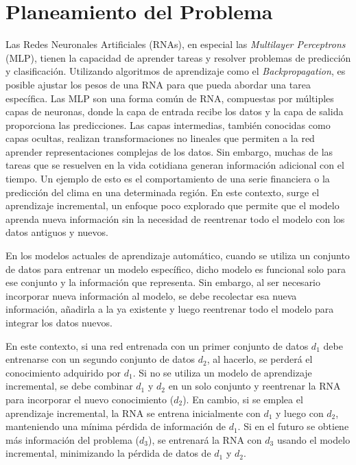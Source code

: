 \section{Planeamiento del Problema}

Las Redes Neuronales Artificiales (RNAs), en especial las \textit{Multilayer Perceptrons} (MLP), tienen la capacidad de aprender tareas y resolver problemas de predicción y clasificación. Utilizando algoritmos de aprendizaje como el \textit{Backpropagation}, es posible ajustar los pesos de una RNA para que pueda abordar una tarea específica. Las MLP son una forma común de RNA, compuestas por múltiples capas de neuronas, donde la capa de entrada recibe los datos y la capa de salida proporciona las predicciones. Las capas intermedias, también conocidas como capas ocultas, realizan transformaciones no lineales que permiten a la red aprender representaciones complejas de los datos. Sin embargo, muchas de las tareas que se resuelven en la vida cotidiana generan información adicional con el tiempo. Un ejemplo de esto es el comportamiento de una serie financiera o la predicción del clima en una determinada región. En este contexto, surge el aprendizaje incremental, un enfoque poco explorado que permite que el modelo aprenda nueva información sin la necesidad de reentrenar todo el modelo con los datos antiguos y nuevos.

En los modelos actuales de aprendizaje automático, cuando se utiliza un conjunto de datos para entrenar un modelo específico, dicho modelo es funcional solo para ese conjunto y la información que representa. Sin embargo, al ser necesario incorporar nueva información al modelo, se debe recolectar esa nueva información, añadirla a la ya existente y luego reentrenar todo el modelo para integrar los datos nuevos.

En este contexto, si una red entrenada con un primer conjunto de datos \(d_1\) debe entrenarse con un segundo conjunto de datos \(d_2\), al hacerlo, se perderá el conocimiento adquirido por \(d_1\). Si no se utiliza un modelo de aprendizaje incremental, se debe combinar \(d_1\) y \(d_2\) en un solo conjunto y reentrenar la RNA para incorporar el nuevo conocimiento (\(d_2\)). En cambio, si se emplea el aprendizaje incremental, la RNA se entrena inicialmente con \(d_1\) y luego con \(d_2\), manteniendo una mínima pérdida de información de \(d_1\). Si en el futuro se obtiene más información del problema (\(d_3\)), se entrenará la RNA con \(d_3\) usando el modelo incremental, minimizando la pérdida de datos de \(d_1\) y \(d_2\).

